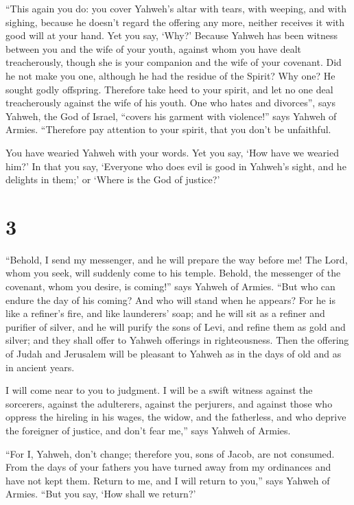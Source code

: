 ``This again you do: you cover Yahweh's altar with tears,
with weeping, and with sighing, because he doesn't regard the offering
any more, neither receives it with good will at your hand. 
Yet you say, `Why?' Because Yahweh has been witness between you and the
wife of your youth, against whom you have dealt treacherously, though
she is your companion and the wife of your covenant.  Did
he not make you one, although he had the residue of the Spirit? Why one?
He sought godly offspring. Therefore take heed to your spirit, and let
no one deal treacherously against the wife of his youth. 
One who hates and divorces'', says Yahweh, the God of Israel, ``covers
his garment with violence!'' says Yahweh of Armies. ``Therefore pay
attention to your spirit, that you don't be unfaithful.

 You have wearied Yahweh with your words. Yet you say, `How
have we wearied him?' In that you say, `Everyone who does evil is good
in Yahweh's sight, and he delights in them;' or `Where is the God of
justice?'

\hypertarget{section-2}{%
\section{3}\label{section-2}}

 ``Behold, I send my messenger, and he will prepare the way
before me! The Lord, whom you seek, will suddenly come to his temple.
Behold, the messenger of the covenant, whom you desire, is coming!''
says Yahweh of Armies.  ``But who can endure the day of his
coming? And who will stand when he appears? For he is like a refiner's
fire, and like launderers' soap;  and he will sit as a
refiner and purifier of silver, and he will purify the sons of Levi, and
refine them as gold and silver; and they shall offer to Yahweh offerings
in righteousness.  Then the offering of Judah and Jerusalem
will be pleasant to Yahweh as in the days of old and as in ancient
years.

 I will come near to you to judgment. I will be a swift
witness against the sorcerers, against the adulterers, against the
perjurers, and against those who oppress the hireling in his wages, the
widow, and the fatherless, and who deprive the foreigner of justice, and
don't fear me,'' says Yahweh of Armies.

 ``For I, Yahweh, don't change; therefore you, sons of
Jacob, are not consumed.  From the days of your fathers you
have turned away from my ordinances and have not kept them. Return to
me, and I will return to you,'' says Yahweh of Armies. ``But you say,
`How shall we return?'

